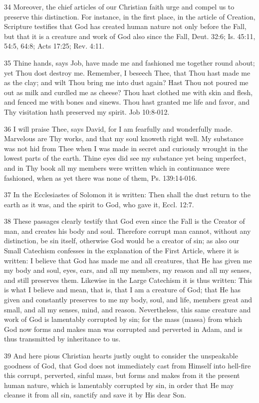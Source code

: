 34 Moreover, the chief articles of our Christian faith urge and compel us to preserve this distinction. For instance, in the first place, in the article of Creation, Scripture testifies that God has created human nature not only before the Fall, but that it is a creature and work of God also since the Fall, Deut. 32:6; Is. 45:11, 54:5, 64:8; Acts 17:25; Rev. 4:11.

35 Thine hands, says Job, have made me and fashioned me together round about; yet Thou dost destroy me. Remember, I beseech Thee, that Thou hast made me as the clay; and wilt Thou bring me into dust again? Hast Thou not poured me out as milk and curdled me as cheese? Thou hast clothed me with skin and flesh, and fenced me with bones and sinews. Thou hast granted me life and favor, and Thy visitation hath preserved my spirit. Job 10:8-012.

36 I will praise Thee, says David, for I am fearfully and wonderfully made. Marvelous are Thy works, and that my soul knoweth right well. My substance was not hid from Thee when I was made in secret and curiously wrought in the lowest parts of the earth. Thine eyes did see my substance yet being unperfect, and in Thy book all my members were written which in continuance were fashioned, when as yet there was none of them, Ps. 139:14-016.

37 In the Ecclesiastes of Solomon it is written: Then shall the dust return to the earth as it was, and the spirit to God, who gave it, Eccl. 12:7.

38 These passages clearly testify that God even since the Fall is the Creator of man, and creates his body and soul. Therefore corrupt man cannot, without any distinction, be sin itself, otherwise God would be a creator of sin; as also our Small Catechism confesses in the explanation of the First Article, where it is written: I believe that God has made me and all creatures, that He has given me my body and soul, eyes, ears, and all my members, my reason and all my senses, and still preserves them. Likewise in the Large Catechism it is thus written: This is what I believe and mean, that is, that I am a creature of God; that He has given and constantly preserves to me my body, soul, and life, members great and small, and all my senses, mind, and reason. Nevertheless, this same creature and work of God is lamentably corrupted by sin; for the mass (massa) from which God now forms and makes man was corrupted and perverted in Adam, and is thus transmitted by inheritance to us.

39 And here pious Christian hearts justly ought to consider the unspeakable goodness of God, that God does not immediately cast from Himself into hell-fire this corrupt, perverted, sinful mass, but forms and makes from it the present human nature, which is lamentably corrupted by sin, in order that He may cleanse it from all sin, sanctify and save it by His dear Son.

